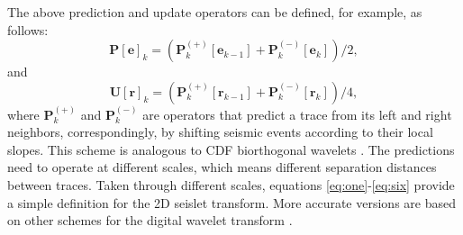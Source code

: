 The above prediction and update operators can be defined, for example, as follows:
\begin{equation}
\label{eq:five}
\mathbf{P}\left[\mathbf{e}\right]_k=\left(\mathbf{P}^{(+)}_k\left[\mathbf{e}_{k-1}\right]+\mathbf{P}^{(-)}_k\left[\mathbf{e}_k\right]\right)/2,
\end{equation}
and
\begin{equation}
\label{eq:six}
\mathbf{U}\left[\mathbf{r}\right]_k=\left(\mathbf{P}^{(+)}_k\left[\mathbf{r}_{k-1}\right]+\mathbf{P}^{(-)}_k\left[\mathbf{r}_k\right]\right)/4,
\end{equation}
where $\mathbf{P}^{(+)}_k$ and $\mathbf{P}^{(-)}_k$ are operators that predict a trace from its left and right neighbors, correspondingly, by shifting seismic events according to their local slopes. 
This scheme is analogous to CDF biorthogonal wavelets \cite[]{cohen1992}. The predictions need to operate at different scales, which means different separation distances between traces. Taken through different scales, equations \ref{eq:one}-\ref{eq:six} provide a simple definition for the 2D seislet transform.  More accurate versions are based on other schemes for the digital wavelet transform \cite[]{liuyang20091}.





















